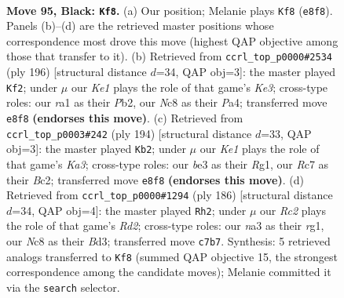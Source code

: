 \documentclass[11pt]{article}
\begin{document}
\clearpage

\begin{figure}[p]\centering
\begin{subfigure}{0.46\textwidth}\centering
\resizebox{\linewidth}{!}{%
\newchessgame
\chessboard[
  setfen={2n1k2K/2r5/p7/P4p1p/8/N3B1Pb/8/R7 b - - 1 95},
  showmover=false,
  pgfstyle=straightmove, color=movearrow, markmove={e8-f8}
]}
\caption{}
\end{subfigure}\hfill
\begin{subfigure}{0.46\textwidth}\centering
\resizebox{\linewidth}{!}{%
\newchessgame
\chessboard[
  setfen={2k5/8/p1p1n1p1/8/PB2P1pP/4K3/1P6/8 w - - 0 99},
  showmover=false,
  pgfstyle=straightmove, color=movearrow, markmove={e3-f2}
]}
\caption{}
\end{subfigure}
\\[4pt]
\begin{subfigure}{0.46\textwidth}\centering
\resizebox{\linewidth}{!}{%
\newchessgame
\chessboard[
  setfen={7k/r2b4/8/2pNP1b1/2P4p/K1P5/2B5/6R1 w - - 5 98},
  showmover=false,
  pgfstyle=straightmove, color=movearrow, markmove={a3-b2}
]}
\caption{}
\end{subfigure}\hfill
\begin{subfigure}{0.46\textwidth}\centering
\resizebox{\linewidth}{!}{%
\newchessgame
\chessboard[
  setfen={8/4k1p1/2b5/4K3/1p5P/3B4/1P1R4/6r1 w - - 1 94},
  showmover=false,
  pgfstyle=straightmove, color=movearrow, markmove={d2-h2}
]}
\caption{}
\end{subfigure}
\caption{\textbf{Move 95, Black: \texttt{Kf8}.} (a) Our position; Melanie plays \texttt{Kf8} (\texttt{e8f8}). Panels (b)--(d) are the retrieved master positions whose correspondence most drove this move (highest QAP objective among those that transfer to it). (b) Retrieved from \texttt{ccrl\_top\_p0000\#2534} (ply 196) [structural distance $d$=34, QAP obj=3]: the master played \texttt{Kf2}; under $\mu$ our \emph{Ke1} plays the role of that game's \emph{Ke3}; cross-type roles: our \emph{r}a1 as their \emph{P}b2, our \emph{N}c8 as their \emph{P}a4; transferred move \texttt{e8f8} \textbf{(endorses this move)}. (c) Retrieved from \texttt{ccrl\_top\_p0003\#242} (ply 194) [structural distance $d$=33, QAP obj=3]: the master played \texttt{Kb2}; under $\mu$ our \emph{Ke1} plays the role of that game's \emph{Ka3}; cross-type roles: our \emph{b}e3 as their \emph{R}g1, our \emph{R}c7 as their \emph{B}c2; transferred move \texttt{e8f8} \textbf{(endorses this move)}. (d) Retrieved from \texttt{ccrl\_top\_p0000\#1294} (ply 186) [structural distance $d$=34, QAP obj=4]: the master played \texttt{Rh2}; under $\mu$ our \emph{Rc2} plays the role of that game's \emph{Rd2}; cross-type roles: our \emph{n}a3 as their \emph{r}g1, our \emph{N}c8 as their \emph{B}d3; transferred move \texttt{c7b7}. Synthesis: 5 retrieved analogs transferred to \texttt{Kf8} (summed QAP objective 15, the strongest correspondence among the candidate moves); Melanie committed it via the \texttt{search} selector.}
\label{fig:thought-m189}
\end{figure}
\end{document}
